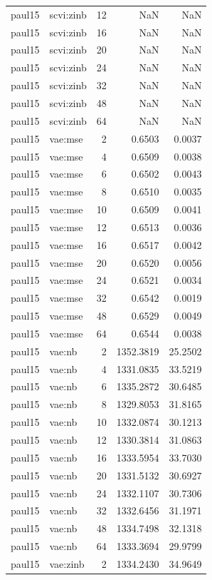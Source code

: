 \begin{tabular}{llrrr}
paul15 & scvi:zinb & 12 & NaN & NaN \\
paul15 & scvi:zinb & 16 & NaN & NaN \\
paul15 & scvi:zinb & 20 & NaN & NaN \\
paul15 & scvi:zinb & 24 & NaN & NaN \\
paul15 & scvi:zinb & 32 & NaN & NaN \\
paul15 & scvi:zinb & 48 & NaN & NaN \\
paul15 & scvi:zinb & 64 & NaN & NaN \\
paul15 & vae:mse & 2 & 0.6503 & 0.0037 \\
paul15 & vae:mse & 4 & 0.6509 & 0.0038 \\
paul15 & vae:mse & 6 & 0.6502 & 0.0043 \\
paul15 & vae:mse & 8 & 0.6510 & 0.0035 \\
paul15 & vae:mse & 10 & 0.6509 & 0.0041 \\
paul15 & vae:mse & 12 & 0.6513 & 0.0036 \\
paul15 & vae:mse & 16 & 0.6517 & 0.0042 \\
paul15 & vae:mse & 20 & 0.6520 & 0.0056 \\
paul15 & vae:mse & 24 & 0.6521 & 0.0034 \\
paul15 & vae:mse & 32 & 0.6542 & 0.0019 \\
paul15 & vae:mse & 48 & 0.6529 & 0.0049 \\
paul15 & vae:mse & 64 & 0.6544 & 0.0038 \\
paul15 & vae:nb & 2 & 1352.3819 & 25.2502 \\
paul15 & vae:nb & 4 & 1331.0835 & 33.5219 \\
paul15 & vae:nb & 6 & 1335.2872 & 30.6485 \\
paul15 & vae:nb & 8 & 1329.8053 & 31.8165 \\
paul15 & vae:nb & 10 & 1332.0874 & 30.1213 \\
paul15 & vae:nb & 12 & 1330.3814 & 31.0863 \\
paul15 & vae:nb & 16 & 1333.5954 & 33.7030 \\
paul15 & vae:nb & 20 & 1331.5132 & 30.6927 \\
paul15 & vae:nb & 24 & 1332.1107 & 30.7306 \\
paul15 & vae:nb & 32 & 1332.6456 & 31.1971 \\
paul15 & vae:nb & 48 & 1334.7498 & 32.1318 \\
paul15 & vae:nb & 64 & 1333.3694 & 29.9799 \\
paul15 & vae:zinb & 2 & 1334.2430 & 34.9649 \\

\end{tabular}

